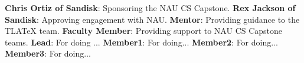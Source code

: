 \textbf{Chris Ortiz of Sandisk}: Sponsoring the NAU CS Capstone.
\textbf{Rex Jackson of Sandisk}: Approving engagement with NAU.
\textbf{Mentor}: Providing guidance to the TLATeX team.
\textbf{Faculty Member}: Providing support to NAU CS Capstone teams.
\textbf{Lead}: For doing ...
\textbf{Member1}: For doing...
\textbf{Member2}: For doing...
\textbf{Member3}: For doing...
